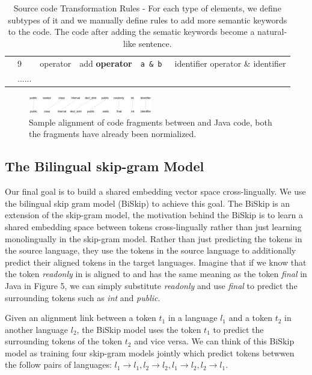 \begin{table}
{\begin{tabular}{p{2cm}|p{0.79cm}|p{2cm}|p{3cm}|p{4cm}|p{4cm}}
			&9& operator & add \textbf{operator} & \texttt{a \& b }&  identifier operator \& identifier \\\cline{2-6}
			&......&&&& \\\cline{2-6}
			
			
			\hline
	\end{tabular}}
	\medskip
	\caption{Source code Transformation Rules - For each type of elements, we define subtypes of it and we manually define rules to add more semantic keywords to the code. The code after adding the sematic keywords become a natural-like sentence.}
\end{table}


\begin{figure}[t!]
	
	\includegraphics[width=0.48\textwidth]{alignment}
	\caption{Sample alignment of code fragments between  and Java code, both the fragments have already been normialized.}
	\label{fig:alignment}
\end{figure}

\subsection{The Bilingual skip-gram Model}

Our final goal is to build a shared embedding vector space cross-lingually. We use the bilingual skip gram model (BiSkip) \cite{luong2015bilingual} to achieve this goal. The BiSkip is an extension of the skip-gram model, the motivation behind the BiSkip is to learn a shared embedding space between tokens cross-lingually rather than just learning monolingually in the skip-gram model. Rather than just predicting the tokens in the source language, they use the tokens in the source language to additionally predict their aligned tokens in the target languages. Imagine that if we know that the token \textit{readonly} in  is aligned to and has the same meaning as the token \textit{final} in Java in Figure 5, we can simply substitute \textit{readonly} and use \textit{final} to predict the surrounding tokens such as \textit{int} and \textit{public}. 

Given an alignment link between a token $t_{1}$ in a language $l_{1}$ and a token $t_{2}$ in another language $l_{2}$, the BiSkip model uses the token $t_{1}$ to predict the surrounding tokens of the token $t_{2}$ and vice versa. We can think of this BiSkip model as training four skip-gram models jointly which predict tokens betwwen the follow pairs of languages: $l_{1} \rightarrow l_{1}, l_{2} \rightarrow l_{2}, l_{1} \rightarrow l_{2}, l_{2} \rightarrow l_{1}$.

